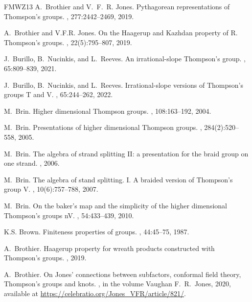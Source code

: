 \documentclass[a4paper, 12pt]{amsart}
\numberwithin{equation}{section}
\theoremstyle{definition}
\begin{document}
\begin{thebibliography}{FMWZ13}
A.~Brothier and V.~F.~R. Jones.
\newblock Pythagorean representations of {T}homspon's groups.
, 277:2442--2469, 2019.

A.~Brothier and V.F.R. Jones.
\newblock On the {H}aagerup and {K}azhdan property of {R}. {T}hompson's groups.
, 22(5):795--807, 2019.

J.~Burillo, B.~Nucinkis, and L.~Reeves.
\newblock An irrational-slope {T}hompson's group.
, 65:809--839, 2021.

J.~Burillo, B.~Nucinkis, and L.~Reeves.
\newblock Irrational-slope versions of {T}hompson's groups {T} and {V}.
, 65:244--262,
  2022.

M.~Brin.
\newblock Higher dimensional {T}hompson groups.
, 108:163--192, 2004.

M.~Brin.
\newblock Presentations of higher dimensional {T}hompson groups.
, 284(2):520--558, 2005.

M.~Brin.
\newblock The algebra of strand splitting {II}: a presentation for the braid
  group on one strand.
, 2006.

M.~Brin.
\newblock The algebra of stand splitting. {I}. {A} braided version of
  {T}hompson's group {V}.
, 10(6):757--788, 2007.

M.~Brin.
\newblock On the baker's map and the simplicity of the higher dimensional {T}hompson's groups nV.
, 54:433--439, 2010.

K.S. Brown.
\newblock Finiteness properties of groups.
, 44:45--75, 1987.

A.~Brothier.
\newblock Haagerup property for wreath products constructed with {T}hompson's
  groups.
, 2019.

A.~Brothier.
\newblock On {J}ones' connections between subfactors, conformal field theory,
  {T}hompson's groups and knots.
, in the volume Vaughan F.~R.~Jones, 2020, available at \url{https://celebratio.org/Jones_VFR/article/821/}.


\end{thebibliography}
\end{document}
